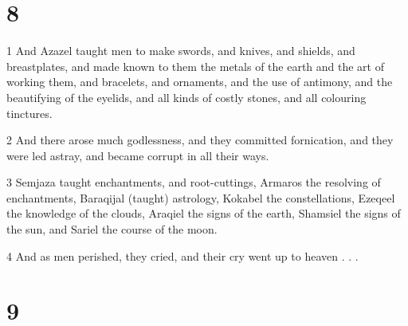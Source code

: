 \chapter{8}

\par 1 And Azazel taught men to make swords, and knives, and shields, and breastplates, and made known to them the metals of the earth and the art of working them, and bracelets, and ornaments, and the use of antimony, and the beautifying of the eyelids, and all kinds of costly stones, and all colouring tinctures.
\par 2 And there arose much godlessness, and they committed fornication, and they were led astray, and became corrupt in all their ways.
\par 3 Semjaza taught enchantments, and root-cuttings, Armaros the resolving of enchantments, Baraqijal (taught) astrology, Kokabel the constellations, Ezeqeel the knowledge of the clouds, Araqiel the signs of the earth, Shamsiel the signs of the sun, and Sariel the course of the moon. 
\par 4 And as men perished, they cried, and their cry went up to heaven . . .

\chapter{9}


